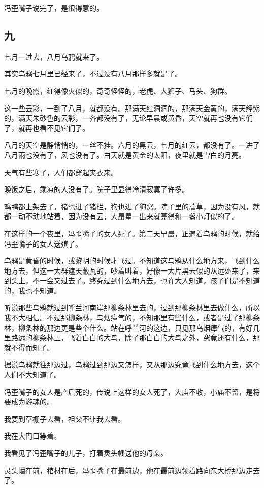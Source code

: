 \documentclass[UTF8]{ctexart}
\begin{document}
冯歪嘴子说完了，是很得意的。

\subsection{九}

七月一过去，八月乌鸦就来了。

其实乌鸦七月里已经来了，不过没有八月那样多就是了。

七月的晚霞，红得像火似的，奇奇怪怪的，老虎、大狮子、马头、狗群。

这一些云彩，一到了八月，就都没有。那满天红洞洞的，那满天金黄的，满天绛紫的，满天朱砂色的云彩，一齐都没有了，无论早晨或黄昏，天空就再也没有它们了，就再也看不见它们了。

八月的天空是静悄悄的，一丝不挂。六月的黑云，七月的红云，都没有了。一进了八月雨也没有了，风也没有了。白天就是黄金的太阳，夜里就是雪白的月亮。

天气有些寒了，人们都穿起夹衣来。

晚饭之后，乘凉的人没有了。院子里显得冷清寂寞了许多。

鸡鸭都上架去了，猪也进了猪栏，狗也进了狗窝。院子里的蒿草，因为没有风，就都一动不动地站着，因为没有云，大昂星一出来就亮得和一盏小灯似的了。

在这样的一个夜里，冯歪嘴子的女人死了。第二天早晨，正遇着乌鸦的时候，就给冯歪嘴子的女人送殡了。

乌鸦是黄昏的时候，或黎明的时候才飞过。不知道这乌鸦从什么地方来，飞到什么地方去，但这一大群遮天蔽瓦的，吵着叫着，好像一大片黑云似的从远处来了，来到头上，不一会又过去了。终究过到什么地方去，也许大人知道，孩子们是不知道的，我也不知道。

听说那些乌鸦就过到呼兰河南岸那柳条林里去的，过到那柳条林里去做什么，所以我不大相信。不过那柳条林，乌烟瘴气的，不知那里有些什么，或者是过了那柳条林，柳条林的那边更是些个什么。站在呼兰河的这边，只见那乌烟瘴气的，有好几里路远的柳条林上，飞着白白的大鸟，除了那白白的大鸟之外，究竟还有什么，那就不得而知了。

据说乌鸦就往那边过，乌鸦过到那边又怎样，又从那边究竟飞到什么地方去，这个人们不大知道了。

冯歪嘴子的女人是产后死的，传说上这样的女人死了，大庙不收，小庙不留，是将要成为游魂的。

我要到草棚子去看，祖父不让我去看。

我在大门口等着。

我看见了冯歪嘴子的儿子，打着灵头幡送他的母亲。

灵头幡在前，棺材在后，冯歪嘴子在最前边，他在最前边领着路向东大桥那边走去了。
\end{document}
